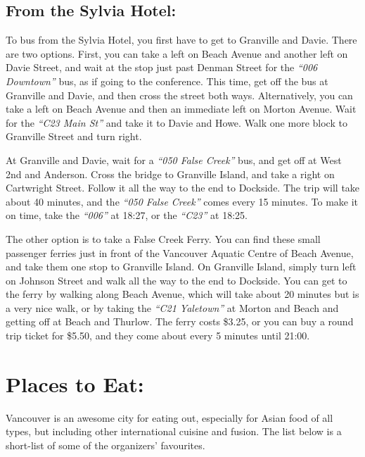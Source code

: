 \documentclass[letterpaper,12pt]{article}
\newcommand{\bus}[1]{\textit{``#1''}}
\begin{document}
\subsection*{From the Sylvia Hotel:}

To bus from the Sylvia Hotel, you first have to get to Granville and Davie. There are two options. First, you can take a left on Beach Avenue and another left on Davie Street, and wait at the stop just past Denman Street for the \bus{006 Downtown} bus, as if going to the conference. This time, get off the bus at Granville and Davie, and then cross the street both ways. Alternatively, you can take a left on Beach Avenue and then an immediate left on Morton Avenue. Wait for the \bus{C23 Main St} and take it to Davie and Howe. Walk one more block to Granville Street and turn right.

At Granville and Davie, wait for a \bus{050 False Creek} bus, and get off at West 2nd and Anderson. Cross the bridge to Granville Island, and take a right on Cartwright Street. Follow it all the way to the end to Dockside. The trip will take about 40 minutes, and the \bus{050 False Creek} comes every 15 minutes. To make it on time, take the \bus{006} at 18:27, or the \bus{C23} at 18:25.

The other option is to take a False Creek Ferry. You can find these small passenger ferries just in front of the Vancouver Aquatic Centre of Beach Avenue, and take them one stop to Granville Island. On Granville Island, simply turn left on Johnson Street and walk all the way to the end to Dockside. You can get to the ferry by walking along Beach Avenue, which will take about 20 minutes but is a very nice walk, or by taking the \bus{C21 Yaletown} at Morton and Beach and getting off at Beach and Thurlow. The ferry costs \$3.25, or you can buy a round trip ticket for \$5.50, and they come about every 5 minutes until 21:00.


\section*{Places to Eat:}

Vancouver is an awesome city for eating out, especially for Asian food of all types, but including other international cuisine and fusion. The list below is a short-list of some of the organizers’ favourites.
\end{document}

